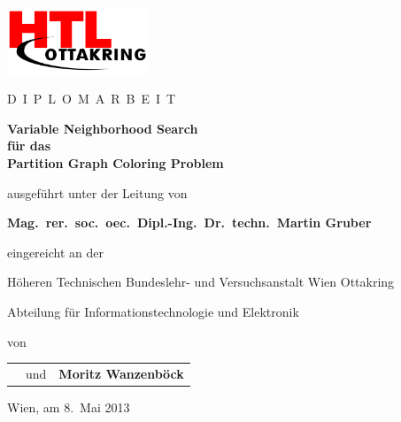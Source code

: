 \begin{titlepage}
\begin{center}
\includegraphics[height=2cm]{../img/htl.png}

\vspace{10mm}

{\Large D}\ {\large I\ P\ L\ O\ M\ A\ R\ B\ E\ I\ T}

\vspace{25mm}

{\Huge\bfseries Variable Neighborhood Search}\\[3mm]
{\Huge\bfseries für das}\\[3mm]
{\Huge\bfseries Partition Graph Coloring Problem}

\vspace{15mm}

ausgeführt unter der Leitung von

\vspace{5mm}

{\large\bfseries Mag.~rer.~soc.~oec.\ Dipl.-Ing.\ Dr.~techn.\ Martin Gruber}

\vspace{5mm}

eingereicht an der

\vspace{5mm}

{\large Höheren Technischen Bundeslehr- und Versuchsanstalt Wien Ottakring}

{\large Abteilung für Informationstechnologie und Elektronik}

\vspace{5mm}

von

\vspace{5mm}
\begin{tabular}{>{\raggedright\arraybackslash}p{}c>{\raggedleft\arraybackslash}p{}}
{\large\bfseries Lorenz Leutgeb} & und & {\large\bfseries Moritz Wanzenböck} \\
\end{tabular}
\end{center}
\vspace*{\fill}

Wien, am 8.~Mai 2013
\end{titlepage}
